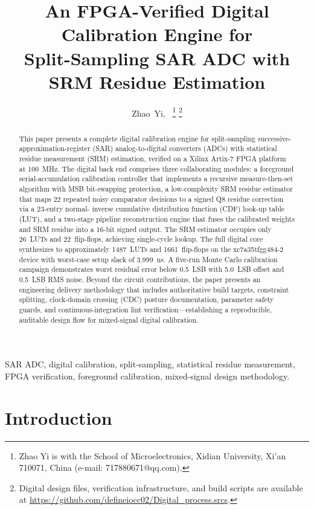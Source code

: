 \documentclass[journal]{IEEEtran}
\title{An FPGA-Verified Digital Calibration Engine for\\[1mm]
       Split-Sampling SAR ADC with SRM Residue Estimation}
\author{
    Zhao~Yi,~\IEEEmembership{Student Member,~IEEE}
    \thanks{Zhao Yi is with the School of Microelectronics,
            Xidian University, Xi'an 710071, China
            (e-mail: 717880671@qq.com).}
    \thanks{Digital design files, verification infrastructure, and build
            scripts are available at
            \url{https://github.com/defineiocc02/Digital\_process.srcs}.}
}
\begin{document}
\maketitle

\begin{abstract}
This paper presents a complete digital calibration engine for split-sampling
successive-approximation-register (SAR) analog-to-digital converters (ADCs)
with statistical residue measurement (SRM) estimation, verified on a Xilinx
Artix-7 FPGA platform at 100~MHz. The digital back end comprises three
collaborating modules: a foreground serial-accumulation calibration controller
that implements a recursive measure-then-set algorithm with MSB bit-swapping
protection, a low-complexity SRM residue estimator that maps 22 repeated noisy
comparator decisions to a signed Q8 residue correction via a 23-entry normal-
inverse cumulative distribution function (CDF) look-up table (LUT), and a
two-stage pipeline reconstruction engine that fuses the calibrated weights
and SRM residue into a 16-bit signed output. The SRM estimator occupies only
26~LUTs and 22~flip-flops, achieving single-cycle lookup. The full digital
core synthesizes to approximately 1487~LUTs and 1661~flip-flops on the
xc7a35tfgg484-2 device with worst-case setup slack of 3.999~ns. A five-run
Monte Carlo calibration campaign demonstrates worst residual error below
0.5~LSB with 5.0~LSB offset and 0.5~LSB RMS noise. Beyond the circuit
contributions, the paper presents an engineering delivery methodology that
includes authoritative build targets, constraint splitting, clock-domain
crossing (CDC) posture documentation, parameter safety guards, and
continuous-integration lint verification---establishing a reproducible,
auditable design flow for mixed-signal digital calibration.
\end{abstract}

\begin{IEEEkeywords}
SAR ADC, digital calibration, split-sampling, statistical residue measurement,
FPGA verification, foreground calibration, mixed-signal design methodology.
\end{IEEEkeywords}

\section{Introduction}
\label{sec:intro}
\end{document}
